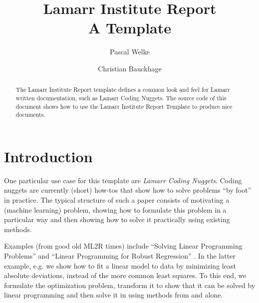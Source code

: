 \documentclass[fleqn,svgnames]{lamarrreport}
\begin{document}


\title[Linear Programming for Robust Regression]{Lamarr Institute Report \\ A Template}


\author[P. Welke]{Pascal Welke}

\author[C. Bauckhage]{Christian Bauckhage}

\begin{abstract}
The Lamarr Institute Report template defines a common look and feel for Lamarr written documentation, such as Lamarr Coding Nuggets. 
The source code of this document shows how to use the Lamarr Institute Report Template to produce nice documents.
\end{abstract}

\maketitle



\section{Introduction}

One particular use case for this template are \emph{Lamarr Coding Nuggets}.
Coding nuggets are currently (short) how-tos that show how to solve problems ``by foot'' in practice.
The typical structure of such a paper consists of motivating a (machine learning) problem, showing how to formulate this problem in a particular way and then showing how to solve it practically using existing methods. 

Examples (from good old ML2R times) include ``Solving Linear Programming Problems'' \cite{Welke2020-SLP} and ``Linear Programming for Robust Regression'' \cite{Welke2020-SLP2}.
In the latter example, e.g. we show how to fit a linear model to data by minimizing least absolute deviations, instead of the more common least squares. 
To this end, we formulate the optimization problem, transform it to show that it can be solved by linear programming and then solve it in  using methods from  and  alone.  
\end{document}
